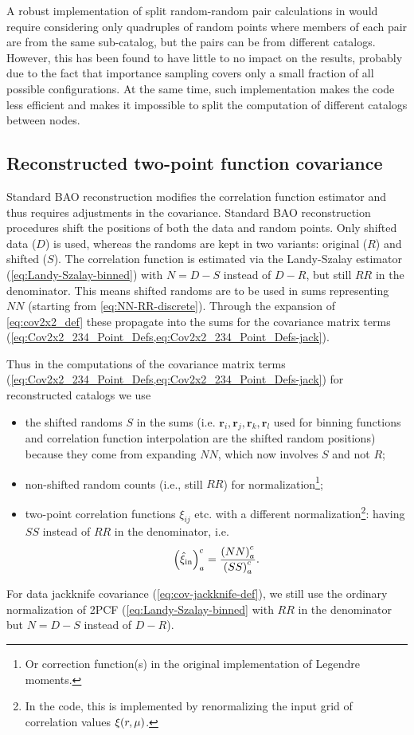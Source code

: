 A robust implementation of split random-random pair calculations in \rascalc{} would require considering only quadruples of random points where members of each pair are from the same sub-catalog, but the pairs can be from different catalogs.
However, this has been found to have little to no impact on the results, probably due to the fact that importance sampling covers only a small fraction of all possible configurations.
At the same time, such implementation makes the code less efficient and makes it impossible to split the computation of different catalogs between nodes.

\subsection{Reconstructed two-point function covariance}
\label{subsec:post-recon}

Standard BAO reconstruction modifies the correlation function estimator and thus requires adjustments in the covariance.
Standard BAO reconstruction procedures shift the positions of both the data and random points.
Only shifted data ($D$) is used, whereas the randoms are kept in two variants: original ($R$) and shifted ($S$).
The correlation function is estimated via the Landy-Szalay estimator (\cref{eq:Landy-Szalay-binned}) with $N=D-S$ instead of $D-R$, but still $RR$ in the denominator.
This means shifted randoms are to be used in sums representing $NN$ (starting from \cref{eq:NN-RR-discrete}).
Through the expansion of \cref{eq:cov2x2_def} these propagate into the sums for the covariance matrix terms (\cref{eq:Cov2x2_234_Point_Defs,eq:Cov2x2_234_Point_Defs-jack}).

Thus in the computations of the covariance matrix terms (\cref{eq:Cov2x2_234_Point_Defs,eq:Cov2x2_234_Point_Defs-jack}) for reconstructed catalogs we use
\begin{itemize}
    \item the shifted randoms $S$ in the sums (i.e. $\bm r_i, \bm r_j, \bm r_k, \bm r_l$ used for binning functions and correlation function interpolation are the shifted random positions) because they come from expanding $NN$, which now involves $S$ and not $R$;
    \item non-shifted random counts (i.e., still $RR$) for normalization\footnote{Or correction function(s) in the original implementation of Legendre moments.};
    \item two-point correlation functions $\xi_{ij}$ etc. with a different normalization\footnote{In the code, this is implemented by renormalizing the input grid of correlation values $\xi\qty(r, \mu)$.}: having $SS$ instead of $RR$ in the denominator, i.e.
    \begin{equation} \label{eq:Landy-Szalay-binned-post-input}
    \qty(\hat\xi_{\rm in})_a^c = \frac{\qty(NN)_a^c}{\qty(SS)_a^c}.
    \end{equation}
\end{itemize}
For data jackknife covariance (\cref{eq:cov-jackknife-def}), we still use the ordinary normalization of 2PCF (\cref{eq:Landy-Szalay-binned} with $RR$ in the denominator but $N=D-S$ instead of $D-R$).

